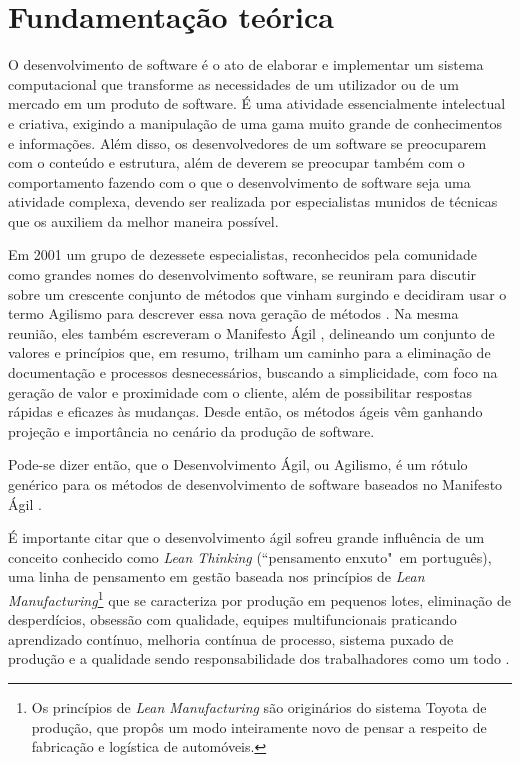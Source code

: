 \chapter{Fundamentação teórica}
\label{cha:fundamentacao_teorica}

O desenvolvimento de software é o ato de elaborar e implementar um sistema computacional que transforme as necessidades de um utilizador ou de um mercado em um produto de software. É uma atividade essencialmente intelectual e criativa, exigindo a manipulação de uma gama muito grande de conhecimentos e informações. Além disso, os desenvolvedores de um software se preocuparem com o conteúdo e estrutura, além de deverem se preocupar também com o comportamento fazendo com o que o desenvolvimento de software seja uma atividade complexa, devendo ser realizada por especialistas munidos de técnicas que os auxiliem da melhor maneira possível.

Em 2001 um grupo de dezessete especialistas, reconhecidos pela comunidade como grandes nomes do desenvolvimento software, se reuniram para discutir sobre um crescente conjunto de métodos que vinham surgindo e decidiram usar o termo Agilismo para descrever essa nova geração de métodos \cite{AgileStory}. Na mesma reunião, eles também escreveram o Manifesto Ágil \cite{AgileManifesto}, delineando um conjunto de valores e princípios que, em resumo, trilham um caminho para a eliminação de documentação e processos desnecessários, buscando a simplicidade, com foco na geração de valor e proximidade com o cliente, além de possibilitar respostas rápidas e eficazes às mudanças. Desde então, os métodos ágeis vêm ganhando projeção e importância no cenário da produção de software.

Pode-se dizer então, que o Desenvolvimento Ágil, ou Agilismo, é um rótulo genérico para os métodos de desenvolvimento de software baseados no Manifesto Ágil \cite{BDDRodrigo}.

É importante citar que o desenvolvimento ágil sofreu grande influência de um conceito conhecido como \textit{Lean Thinking} (``pensamento enxuto"\ em português), uma linha de pensamento em gestão baseada nos princípios de \textit{Lean Manufacturing}\footnote{Os princípios de \textit{Lean Manufacturing} são originários do sistema Toyota de produção, que propôs um modo inteiramente novo de pensar a respeito de fabricação e logística de automóveis.} que se caracteriza por produção em pequenos lotes, eliminação de desperdícios, obsessão com qualidade, equipes multifuncionais praticando aprendizado contínuo, melhoria contínua de processo, sistema puxado de produção e a qualidade sendo responsabilidade dos trabalhadores como um todo \cite{BDDRodrigo}.


